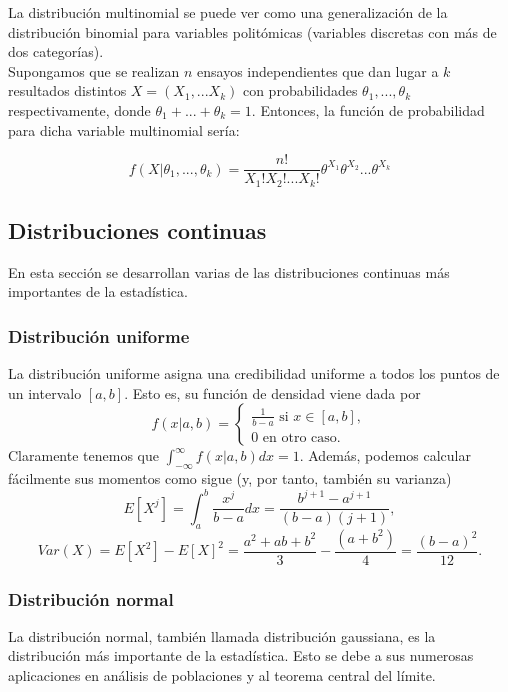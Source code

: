 \documentclass{article}
\begin{document}
\begin{definition}
La distribución multinomial se puede ver como una generalización de la distribución binomial para variables politómicas (variables discretas con más de dos categorías). 
\\Supongamos que se realizan $n$ ensayos independientes que dan lugar a $k$ resultados distintos $X = (X_1, ... X_k)$  con probabilidades $\theta_1, ... , \theta_k$ respectivamente, donde $\theta_1+... + \theta_k = 1$. Entonces, la función de probabilidad para dicha variable multinomial sería:

\[
f(X|\theta_1, ... , \theta_k) = \frac{n!}{X_1! X_2! ... X_k!} \theta^{X_1} \theta^{X_2} ... \theta^{X_k} 
\]   

\end{definition}

\subsection{Distribuciones continuas}

En esta sección se desarrollan varias de las distribuciones continuas más importantes de la estadística.

\subsubsection{Distribución uniforme}

La distribución uniforme asigna una credibilidad uniforme a todos los puntos de un intervalo $[a,b]$. Esto es, su función de densidad viene dada por
\[f(x|a,b) = \begin{cases}\frac{1}{b-a} \text{ si } x \in [a,b], \\ 0 \text{ en otro caso.}\end{cases}\]
Claramente tenemos que $\int_{-\infty}^{\infty} f(x |a,b) dx = 1$. Además, podemos calcular fácilmente sus momentos como sigue (y, por tanto, también su varianza)
\[E[X^j] = \int_a^b \frac{x^j}{b-a} dx = \frac{b^{j+1} - a^{j+1}}{(b-a) (j+1)},\]
\[Var(X) = E[X^2] - E[X]^2 = \frac{a^2 + ab + b^2}{3} - \frac{(a+b^2)}{4} = \frac{(b-a)^2}{12}.\]

\subsubsection{Distribución normal}

La distribución normal, también llamada distribución gaussiana, es la distribución más importante de la estadística. Esto se debe a sus numerosas aplicaciones en análisis de poblaciones y al teorema central del límite.
\end{document}
